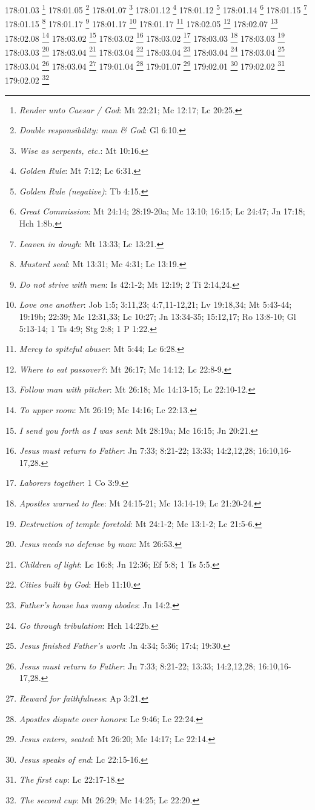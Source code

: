 178:01.03 \footnote{\textit{Render unto Caesar / God}: Mt 22:21; Mc 12:17; Lc 20:25.}
178:01.05 \footnote{\textit{Double responsibility: man & God}: Gl 6:10.}
178:01.07 \footnote{\textit{Wise as serpents, etc.}: Mt 10:16.}
178:01.12 \footnote{\textit{Golden Rule}: Mt 7:12; Lc 6:31.}
178:01.12 \footnote{\textit{Golden Rule (negative)}: Tb 4:15.}
178:01.14 \footnote{\textit{Great Commission}: Mt 24:14; 28:19-20a; Mc 13:10; 16:15; Lc 24:47; Jn 17:18; Hch 1:8b.}
178:01.15 \footnote{\textit{Leaven in dough}: Mt 13:33; Lc 13:21.}
178:01.15 \footnote{\textit{Mustard seed}: Mt 13:31; Mc 4:31; Lc 13:19.}
178:01.17 \footnote{\textit{Do not strive with men}: Is 42:1-2; Mt 12:19; 2 Ti 2:14,24.}
178:01.17 \footnote{\textit{Love one another}: Job 1:5; 3:11,23; 4:7,11-12,21; Lv 19:18,34; Mt 5:43-44; 19:19b; 22:39; Mc 12:31,33; Lc 10:27; Jn 13:34-35; 15:12,17; Ro 13:8-10; Gl 5:13-14; 1 Ts 4:9; Stg 2:8; 1 P 1:22.}
178:01.17 \footnote{\textit{Mercy to spiteful abuser}: Mt 5:44; Lc 6:28.}
178:02.05 \footnote{\textit{Where to eat passover?}: Mt 26:17; Mc 14:12; Lc 22:8-9.}
178:02.07 \footnote{\textit{Follow man with pitcher}: Mt 26:18; Mc 14:13-15; Lc 22:10-12.}
178:02.08 \footnote{\textit{To upper room}: Mt 26:19; Mc 14:16; Lc 22:13.}
178:03.02 \footnote{\textit{I send you forth as I was sent}: Mt 28:19a; Mc 16:15; Jn 20:21.}
178:03.02 \footnote{\textit{Jesus must return to Father}: Jn 7:33; 8:21-22; 13:33; 14:2,12,28; 16:10,16-17,28.}
178:03.02 \footnote{\textit{Laborers together}: 1 Co 3:9.}
178:03.03 \footnote{\textit{Apostles warned to flee}: Mt 24:15-21; Mc 13:14-19; Lc 21:20-24.}
178:03.03 \footnote{\textit{Destruction of temple foretold}: Mt 24:1-2; Mc 13:1-2; Lc 21:5-6.}
178:03.03 \footnote{\textit{Jesus needs no defense by man}: Mt 26:53.}
178:03.04 \footnote{\textit{Children of light}: Lc 16:8; Jn 12:36; Ef 5:8; 1 Ts 5:5.}
178:03.04 \footnote{\textit{Cities built by God}: Heb 11:10.}
178:03.04 \footnote{\textit{Father's house has many abodes}: Jn 14:2.}
178:03.04 \footnote{\textit{Go through tribulation}: Hch 14:22b.}
178:03.04 \footnote{\textit{Jesus finished Father's work}: Jn 4:34; 5:36; 17:4; 19:30.}
178:03.04 \footnote{\textit{Jesus must return to Father}: Jn 7:33; 8:21-22; 13:33; 14:2,12,28; 16:10,16-17,28.}
178:03.04 \footnote{\textit{Reward for faithfulness}: Ap 3:21.}
179:01.04 \footnote{\textit{Apostles dispute over honors}: Lc 9:46; Lc 22:24.}
179:01.07 \footnote{\textit{Jesus enters, seated}: Mt 26:20; Mc 14:17; Lc 22:14.}
179:02.01 \footnote{\textit{Jesus speaks of end}: Lc 22:15-16.}
179:02.02 \footnote{\textit{The first cup}: Lc 22:17-18.}
179:02.02 \footnote{\textit{The second cup}: Mt 26:29; Mc 14:25; Lc 22:20.}
